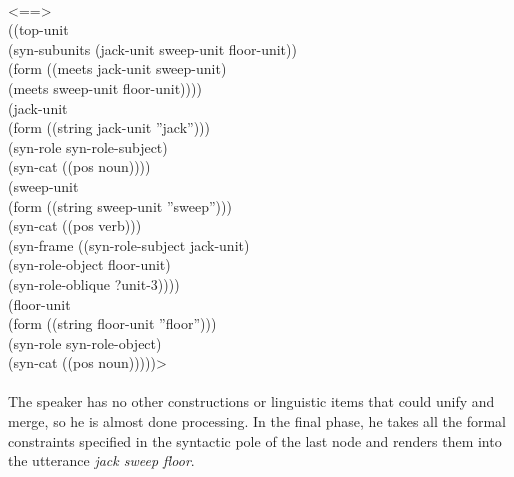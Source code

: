{{\\ <==>
\\ ((top-unit
\\ \hspace*{5mm} (syn-subunits (jack-unit sweep-unit floor-unit))
\\ \hspace*{5mm} (form ((meets jack-unit sweep-unit) 
\\ \hspace*{18,5mm} (meets sweep-unit floor-unit))))
\\ \hspace*{2mm}(jack-unit
\\ \hspace*{5mm} (form ((string jack-unit ''jack'')))
\\ \hspace*{5mm} (syn-role syn-role-subject)
\\ \hspace*{5mm} (syn-cat ((pos noun))))
\\ \hspace*{2mm}(sweep-unit
\\ \hspace*{5mm} (form ((string sweep-unit ''sweep'')))
\\ \hspace*{5mm} (syn-cat ((pos verb)))
\\ \hspace*{5mm} (syn-frame ((syn-role-subject jack-unit)
\\ \hspace*{30mm}(syn-role-object floor-unit)
\\ \hspace*{30mm}(syn-role-oblique ?unit-3))))
\\ \hspace*{2mm}(floor-unit
\\ \hspace*{5mm} (form ((string floor-unit ''floor'')))
\\ \hspace*{5mm} (syn-role syn-role-object)
\\ \hspace*{5mm} (syn-cat ((pos noun)))))>}}
\\
\\
The speaker has no other constructions or linguistic items that could unify and merge, so he is almost done processing. In the final phase, he takes all the formal constraints specified in the syntactic pole of the last node and renders them into the utterance {\em jack sweep floor}.

